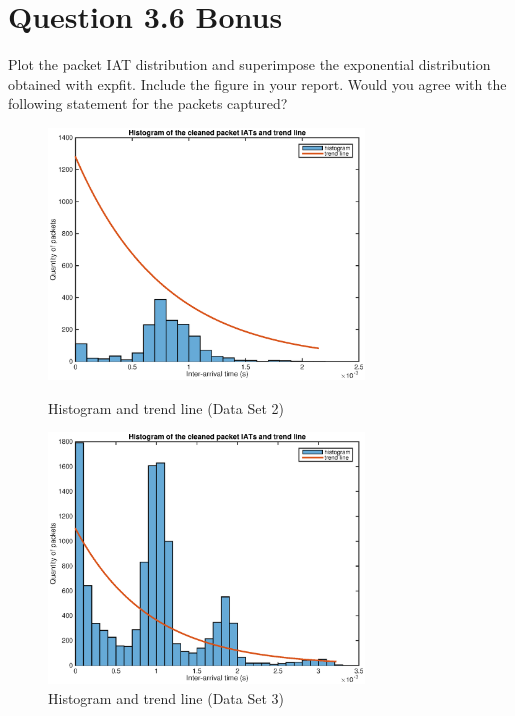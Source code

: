 \documentclass{article}
\newenvironment{homeworkProblem}[1]{
	\section*{#1}
	}{
}
\begin{document}
\begin{homeworkProblem}{Question 3.6 Bonus}
Plot the packet IAT distribution and superimpose the exponential distribution obtained with expfit. Include the figure in your report. Would you agree with the following statement for the packets captured?\\

\begin{figure}[H]
\begin{minipage}[t]{0.5\linewidth}
\centering
\includegraphics[width=3.3in]{img/histogram2.eps}
\caption{Histogram and trend line (Data Set 2)}
\end{minipage}
\begin{minipage}[t]{0.5\linewidth}
\centering
\includegraphics[width=3.3in]{img/histogram3.eps}
\caption{Histogram and trend line (Data Set 3)}
\end{minipage}
\end{figure}
\end{homeworkProblem}
\end{document}
